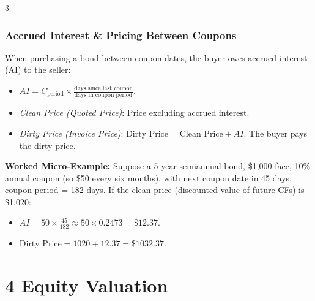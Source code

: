 \documentclass[10pt,landscape,fleqn]{article}
\begin{document}
\begin{multicols}{3}
\subsubsection*{Accrued Interest \& Pricing Between Coupons}
When purchasing a bond between coupon dates, the buyer owes accrued interest (AI) to the seller:
\begin{itemize}
  \item $AI = C_{\mathrm{period}} \times \frac{\text{days since last coupon}}{\text{days in coupon period}}.$
\end{itemize}
\begin{itemize}
  \item \emph{Clean Price (Quoted Price)}: Price excluding accrued interest.
  \item \emph{Dirty Price (Invoice Price)}: $\text{Dirty Price} = \text{Clean Price} + AI.$ The buyer pays the dirty price.
\end{itemize}

\textbf{Worked Micro‐Example:} Suppose a 5‐year semiannual bond, \$1,000 face, 10\% annual coupon (so \$50 every six months), with next coupon date in 45 days, coupon period = 182 days. If the clean price (discounted value of future CFs) is \$1,020:
\begin{itemize}
  \item $AI = 50 \times \frac{45}{182} \approx 50 \times 0.2473 = \$12.37.$
  \item $\text{Dirty Price} = 1020 + 12.37 = \$1032.37.$
\end{itemize}

\section*{4 Equity Valuation}


\end{multicols}
\end{document}

